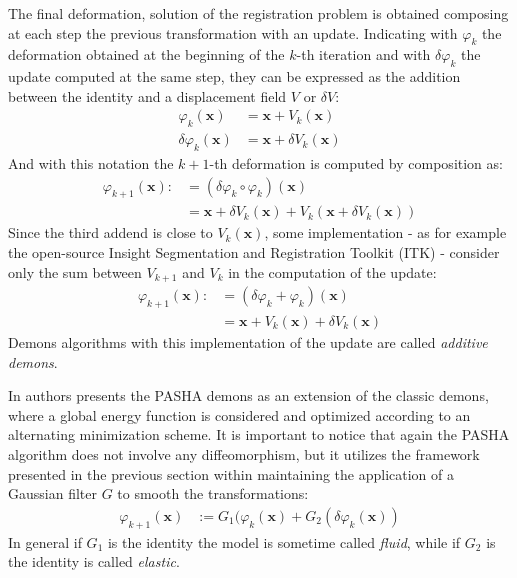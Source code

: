 The final deformation, solution of the registration problem is obtained composing at each step the previous transformation with an update. Indicating with $\varphi_{k}$ the deformation obtained at the beginning of the $k$-th iteration and with $\delta \varphi_{k}$ the update computed at the same step, they can be expressed as the addition between the identity and a displacement field $V$ or $\delta V$:
\begin{align*}
	\varphi_{k}(\mathbf{x}) &= \mathbf{x} + V_{k}(\mathbf{x}) \\ 
	\delta \varphi_{k}(\mathbf{x}) &= \mathbf{x} + \delta V_{k}(\mathbf{x}) 
\end{align*}
And with this notation the $k+1$-th deformation is computed by composition as:
\begin{align*}
\varphi_{k+1}(\mathbf{x})  :&= (\delta \varphi_{k}\circ \varphi_{k})(\mathbf{x}) \\
&= \mathbf{x} + \delta V_{k}(\mathbf{x}) + V_{k}(\mathbf{x} + \delta V_{k}(\mathbf{x}))
\end{align*}
Since the third addend is close to $V_{k}(\mathbf{x})$, some implementation - as for example the open-source Insight Segmentation and Registration Toolkit (ITK)  - consider only the sum between 
$ V_{k+1}$ and $V_{k}$ in the computation of the update:
\begin{align*}
\varphi_{k+1}(\mathbf{x})  :&= (\delta \varphi_{k} + \varphi_{k})(\mathbf{x}) \\
&= \mathbf{x} + V_{k}(\mathbf{x}) + \delta V_{k}(\mathbf{x})
\end{align*}
Demons algorithms with this implementation of the update are called \emph{additive demons}.

In \cite{cachier2003iconic} authors presents the PASHA demons as an extension of the classic demons, where a global energy function is considered and optimized according to an alternating minimization scheme. 
It is important to notice that again the PASHA algorithm does not involve any diffeomorphism, but it utilizes the framework presented in the previous section within maintaining the application of a Gaussian filter $G$ to smooth the transformations:
\begin{align*}
\varphi_{k+1}(\mathbf{x})  &:= G_{1}(\varphi_{k}(\mathbf{x}) + G_{2}(\delta \varphi_{k}(\mathbf{x}))
\end{align*}
In general if $G_{1}$ is the identity the model is sometime called \emph{fluid}, while if $G_{2}$ is the identity is called \emph{elastic}.

